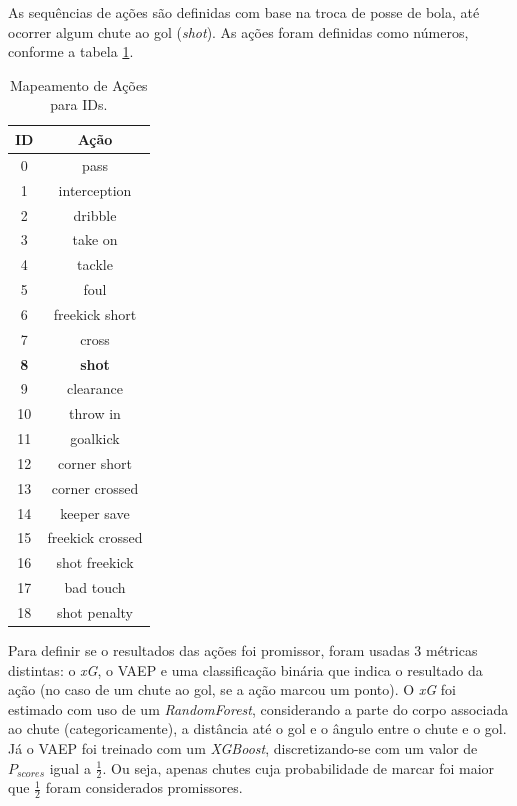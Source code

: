 \documentclass{article}
\begin{document}
As sequências de ações são definidas com base na troca de posse de bola, até
ocorrer algum chute ao gol (\textit{shot}). As ações foram definidas como números, conforme a
tabela \ref{tab:id_to_action_map}.

\begin{table}[H]
	\centering
	\begin{tabular}{|c|c|}
		\hline
		\textbf{ID}            & \textbf{Ação}
		\\ \hline
		0 & pass
		\\ \hline
		1 & interception
		\\ \hline
		2 & dribble
		\\ \hline
		3 & take on
		\\ \hline
		4 & tackle
		\\ \hline
		5 & foul
		\\ \hline
		6 & freekick short
		\\ \hline
		7 & cross
		\\ \hline
		\textbf{8} & \textbf{shot}
		\\ \hline
		9 & clearance
		\\ \hline
		10 & throw in
		\\ \hline
		11 & goalkick
		\\ \hline
		12 & corner short
		\\ \hline
		13 & corner crossed
		\\ \hline
		14 & keeper save
		\\ \hline
		15 & freekick crossed
		\\ \hline
		16 & shot freekick
		\\ \hline
		17 & bad touch
		\\ \hline
		18 & shot penalty
		\\ \hline
	\end{tabular}
	\caption{Mapeamento de Ações para IDs.}
	\label{tab:id_to_action_map}
\end{table}

Para definir se o resultados das ações foi promissor, foram usadas 3 métricas
distintas: o \textit{xG}, o VAEP e uma classificação binária que indica o
resultado da ação (no caso de um chute ao gol, se a ação marcou um ponto). O
\textit{xG} foi estimado com uso de um \textit{RandomForest}, considerando a
parte do corpo associada ao chute (categoricamente), a distância até o gol e o
ângulo entre o chute e o gol. Já o VAEP foi treinado com um \textit{XGBoost},
discretizando-se com um valor de $P_{scores}$ igual a $\frac{1}{2}$. Ou seja,
apenas chutes cuja probabilidade de marcar foi maior que $\frac{1}{2}$ foram
considerados promissores.
\end{document}
